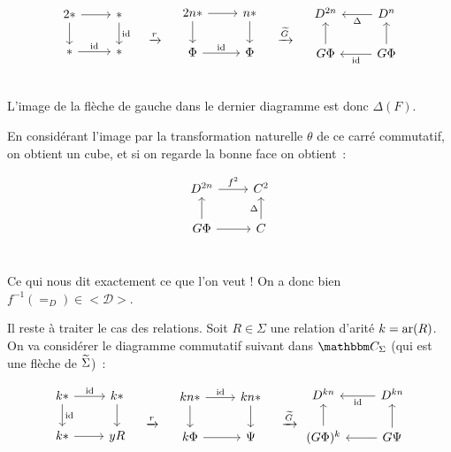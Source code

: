 \begin{pv}
    \[\begin{tikzcd}
        2\ast\arrow[r]\arrow[d] & \ast\arrow[d,"\id"] \\
        \ast\arrow[r, "\id"] & \ast \\
    \end{tikzcd}\quad\xrightarrow{r}\quad\begin{tikzcd}
        2n\ast\arrow[r]\arrow[d] & n\ast\arrow[d] \\
        \Phi\arrow[r,"\id"] & \Phi \\
    \end{tikzcd}\quad\xrightarrow{\tg}\quad\begin{tikzcd}
        D^{2n} & D^n\arrow[l,"\Delta"] \\
        G\Phi\arrow[u] & G\Phi\arrow[l,"\id"]\arrow[u] \\
    \end{tikzcd}\]

    L'image de la flèche de gauche dans le dernier diagramme est donc $\Delta(F)$.

    En considérant l'image par la transformation naturelle $\theta$ de ce carré commutatif,
    on obtient un cube, et si on regarde la bonne face on obtient~:

    \[\begin{tikzcd}
        D^{2n}\arrow[r, "f^2"] & C^2 \\
        G\Phi\arrow[u]\arrow[r] & C\arrow[u, "\Delta"] \\
    \end{tikzcd}\]

    Ce qui nous dit exactement ce que l'on veut ! On a donc bien
    $f^{-1}(=_D)\in <\mathscr{D}>$.

    Il reste à traiter le cas des relations. Soit $R\in\Sigma$ une relation d'arité
    $k = \text{ar}(R)$. On va considérer le diagramme commutatif suivant dans $\C_\Sigma$ (qui
    est une flèche de $\widetilde{\Sigma}$)~:

    \[\begin{tikzcd}
        k\ast\arrow[d, "\id"]\arrow[r,"\id"] & k\ast\arrow[d] \\
        k\ast\arrow[r]                       & yR \\
    \end{tikzcd}\quad\xrightarrow{r}\quad\begin{tikzcd}
        kn\ast\arrow[d]\arrow[r,"\id"] & kn\ast\arrow[d] \\
        k\Phi\arrow[r]                 & \Psi \\
    \end{tikzcd}\quad\xrightarrow{\tg}\begin{tikzcd}
        D^{kn} & D^{kn}\arrow[l, "\id"] \\
        (G\Phi)^k\arrow[u] & G\Psi\arrow[l]\arrow[u] \\
    \end{tikzcd}\]


\end{pv}
